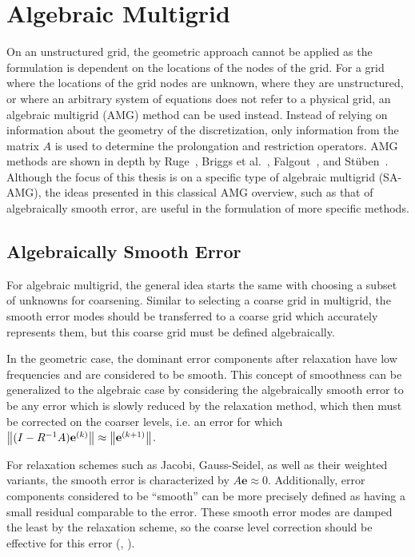 


\section{Algebraic Multigrid}


On an unstructured grid, the geometric approach cannot be applied as the formulation is dependent on the locations of the nodes of the grid. For a grid where the locations of the grid nodes are unknown, where they are unstructured, or where an arbitrary system of equations does not refer to a physical grid, an algebraic multigrid (AMG) method can be used instead. Instead of relying on information about the geometry of the discretization, only information from the matrix $A$ is used to determine the prolongation and restriction operators. AMG methods are shown in depth by Ruge~\cite{Ruge1987}, Briggs et al.~\cite{Briggs2000}, Falgout~\cite{Falgout2006}, and Stüben~\cite{Stuben1999}. Although the focus of this thesis is on a specific type of algebraic multigrid (SA-AMG), the ideas presented in this classical AMG overview, such as that of algebraically smooth error, are useful in the formulation of more specific methods.

\subsection{Algebraically Smooth Error}

For algebraic multigrid, the general idea starts the same with choosing a subset of unknowns for coarsening. Similar to selecting a coarse grid in multigrid, the smooth error modes should be transferred to a coarse grid which accurately represents them, but this coarse grid must be defined algebraically.

In the geometric case, the dominant error components after relaxation have low frequencies and are considered to be smooth. This concept of smoothness can be generalized to the algebraic case by considering the algebraically smooth error to be any error which is slowly reduced by the relaxation method, which then must be corrected on the coarser levels, i.e. an error for which $ \left\lVert(I - R^{-1}A)\mathbf{e}^{(k)}\right\rVert \approx \left\lVert \mathbf{e}^{(k+1)} \right\rVert $.

For relaxation schemes such as Jacobi, Gauss-Seidel, as well as their weighted variants, the smooth error is characterized by $ A\mathbf{e} \approx 0 $. Additionally, error components considered to be “smooth” can be more precisely defined as having a small residual comparable to the error. These smooth error modes are damped the least by the relaxation scheme, so the coarse level correction should be effective for this error (\cite{Falgout2006}, \cite{Ruge1987}).

